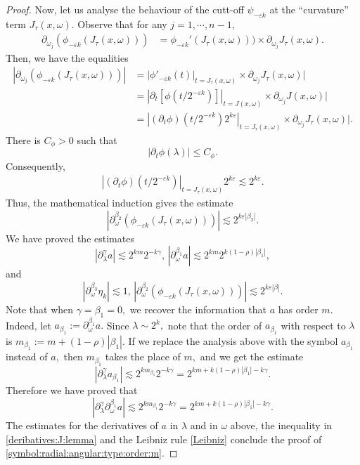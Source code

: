 \documentclass[12pt, reqno]{amsart}
\theoremstyle{definition}
\theoremstyle{remark}
\numberwithin{equation}{section}
\begin{document}
\begin{proof}
Now, let us analyse the behaviour of the cutt-off $\psi_{-\varepsilon k}$ at the ``curvature'' term $J_\tau(x,\omega).$ Observe that for any $j=1,\cdots, n-1,$
\begin{align*}
\partial_{\omega_j}(\phi_{-\varepsilon k}(J_\tau(x,\omega)))&=\phi_{-\varepsilon k}'(J_\tau(x,\omega)))\times \partial_{\omega_j}J_\tau(x,\omega).
\end{align*} Then, we have the equalities
\begin{align*}
    |\partial_{\omega_j}(\phi_{-\varepsilon k}(J_{\tau}(x,\omega)))| &=|\phi'_{-\varepsilon k}(t)|_{t=J_\tau(x,\omega)}\times \partial_{\omega_j}J_\tau(x,\omega)|\\
    &=|\partial_{t}[\phi(t/2^{-\varepsilon k})]|_{t=J(x,\omega)}\times \partial_{\omega_j}J(x,\omega)|\\
    &=|(\partial_{t}\phi)(t/2^{-\varepsilon k})2^{k\varepsilon}|_{t=J_\tau(x,\omega)}\times \partial_{\omega_j}J_\tau(x,\omega)|.    
\end{align*}There is $C_\phi>0$ such that
\begin{equation*}
    |\partial_{t}\phi(\lambda)|\leq C_{\phi}.
\end{equation*}Consequently, 
\begin{align*}
    |(\partial_{t}\phi)(t/2^{-\varepsilon k})|_{t=J_\tau(x,\omega)}2^{k\varepsilon}\lesssim  2^{k\varepsilon }.
\end{align*}Thus, the mathematical induction gives the estimate
\begin{equation}
    |\partial_\omega^{\beta_2}(\phi_{-\varepsilon k}(J_{\tau}(x,\omega)))|\lesssim 2^{k\varepsilon|\beta_2|}.
\end{equation}We have proved the estimates
$$  |\partial_\lambda^\gamma a|\lesssim 2^{km}2^{-k\gamma} ,\,  |\partial_\omega^{\beta_1} a|\lesssim 2^{km}2^{k(1-\rho)|\beta_1|},$$
and 
\begin{equation}\label{deribatives:J:lemma}
    |\partial_\omega^{\beta_3} \eta_k|\lesssim 1,\, |\partial_\omega^{\beta_2}(\phi_{-\varepsilon k}(J_{\tau}(x,\omega)))|\lesssim 2^{k\varepsilon|\beta|}.
\end{equation}
Note that when $\gamma=\beta_1=0,$ we recover the information that $a$ has order $m.$ Indeed,  let $a_{\beta_1}:= \partial_\omega^{\beta_1} a.$ Since $\lambda\sim 2^{k},$ note that the order of $a_{\beta_1}$ with respect to $\lambda$ is $m_{\beta_1}:=m+(1-\rho)|\beta_1|.$ If we replace the analysis above with the symbol  $a_{\beta_1}$ instead of $a,$  then $m_{\beta_1}$ takes the place of $m,$  and we get the estimate
$$  |\partial_\lambda^\gamma a_{\beta_1}|\lesssim 2^{km_{\beta_1}}2^{-k\gamma} =2^{km+k(1-\rho)|\beta_1|-k\gamma}. $$
Therefore we have proved that 
$$  |\partial_\lambda^\gamma \partial_\omega^{\beta_1} a|\lesssim 2^{km_{\beta_1}}2^{-k\gamma} =2^{km+k(1-\rho)|\beta_1|-k\gamma}. $$
The estimates for the derivatives of $a$ in $\lambda$ and in $\omega$ above, the inequality in \eqref{deribatives:J:lemma} and the Leibniz rule \eqref{Leibniz} conclude the proof of \eqref{symbol:radial:angular:type:order:m}.
\end{proof}
\end{document}
